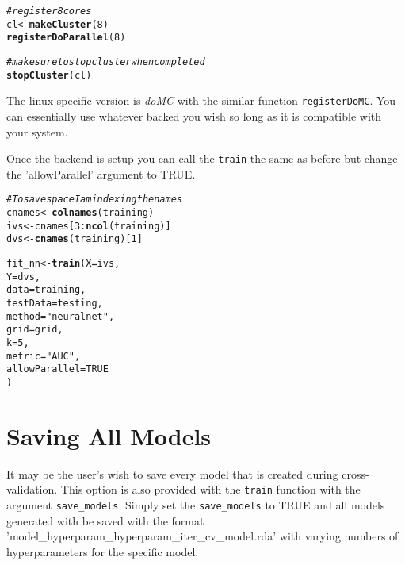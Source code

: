 \documentclass[12pt]{article}\usepackage[]{graphicx}\usepackage[]{color}
\makeatletter
\newcommand{\hlnum}[1]{\textcolor[rgb]{0.686,0.059,0.569}{#1}}%
\newcommand{\hlstr}[1]{\textcolor[rgb]{0.192,0.494,0.8}{#1}}%
\newcommand{\hlcom}[1]{\textcolor[rgb]{0.678,0.584,0.686}{\textit{#1}}}%
\newcommand{\hlopt}[1]{\textcolor[rgb]{0,0,0}{#1}}%
\newcommand{\hlstd}[1]{\textcolor[rgb]{0.345,0.345,0.345}{#1}}%
\newcommand{\hlkwb}[1]{\textcolor[rgb]{0.69,0.353,0.396}{#1}}%
\newcommand{\hlkwc}[1]{\textcolor[rgb]{0.333,0.667,0.333}{#1}}%
\newcommand{\hlkwd}[1]{\textcolor[rgb]{0.737,0.353,0.396}{\textbf{#1}}}%
\newenvironment{kframe}{%
 \def\at@end@of@kframe{}%
 \ifinner\ifhmode%
  \def\at@end@of@kframe{\end{minipage}}%
  \begin{minipage}{\columnwidth}%
 \fi\fi%
 \def\FrameCommand##1{\hskip\@totalleftmargin \hskip-\fboxsep
 \colorbox{shadecolor}{##1}\hskip-\fboxsep
     \hskip-\linewidth \hskip-\@totalleftmargin \hskip\columnwidth}%
 \MakeFramed {\advance\hsize-\width
   \@totalleftmargin\z@ \linewidth\hsize
   \@setminipage}}%
 {\par\unskip\endMakeFramed%
 \at@end@of@kframe}
\newenvironment{knitrout}{}{} %
\newcommand{\Rpackage}[1]{\textsl{#1}}
\newcommand{\Rcode}[1]{\texttt{#1}}
\newcommand{\Rfunction}[1]{\Rcode{#1}}
\makeatother
\begin{document}
\begin{knitrout}
\color{fgcolor}\begin{kframe}
\begin{alltt}
\hlcom{# register 8 cores}
\hlstd{cl} \hlkwb{<-} \hlkwd{makeCluster}\hlstd{(}\hlnum{8}\hlstd{)}
\hlkwd{registerDoParallel}\hlstd{(}\hlnum{8}\hlstd{)}

\hlcom{# make sure to stop cluster when completed}
\hlkwd{stopCluster}\hlstd{(cl)}
\end{alltt}
\end{kframe}
\end{knitrout}

The linux specific version is \Rpackage{doMC} with the similar function \Rfunction{registerDoMC}.  You can
essentially use whatever backed you wish so long as it is compatible with your system.

Once the backend is setup you can call the \Rfunction{train} the same as before but change the 'allowParallel' argument
to TRUE.

\begin{knitrout}
\color{fgcolor}\begin{kframe}
\begin{alltt}
\hlcom{# To save space I am indexing the names}
\hlstd{cnames} \hlkwb{<-} \hlkwd{colnames}\hlstd{(training)}
\hlstd{ivs} \hlkwb{<-} \hlstd{cnames[}\hlnum{3}\hlopt{:}\hlkwd{ncol}\hlstd{(training)]}
\hlstd{dvs} \hlkwb{<-} \hlkwd{cnames}\hlstd{(training)[}\hlnum{1}\hlstd{]}

\hlstd{fit_nn} \hlkwb{<-} \hlkwd{train}\hlstd{(}\hlkwc{X} \hlstd{= ivs,}
                \hlkwc{Y} \hlstd{= dvs,}
                \hlkwc{data} \hlstd{= training,}
                \hlkwc{testData} \hlstd{= testing,}
                \hlkwc{method} \hlstd{=} \hlstr{"neuralnet"}\hlstd{,}
                \hlkwc{grid} \hlstd{= grid,}
                \hlkwc{k} \hlstd{=} \hlnum{5}\hlstd{,}
                \hlkwc{metric} \hlstd{=} \hlstr{"AUC"}\hlstd{,}
                \hlkwc{allowParallel} \hlstd{=} \hlnum{TRUE}
\hlstd{)}
\end{alltt}
\end{kframe}
\end{knitrout}

\maketitle
\section{Saving All Models}
It may be the user's wish to save every model that is created during cross-validation.  
This option is also provided with the \Rfunction{train} function with the argument \Rcode{save\_models}.  
Simply set the \Rcode{save\_models} to TRUE and all models generated with be saved with the format 
'model\_hyperparam\_hyperparam\_iter\_cv\_model.rda' with varying numbers of hyperparameters for the 
specific model.
\end{document}
